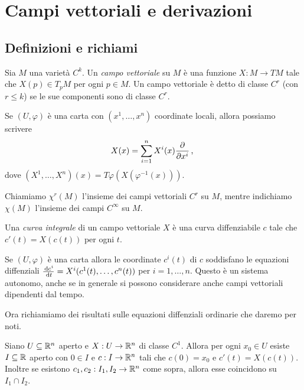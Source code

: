 \chapter{Campi vettoriali e derivazioni}

\section{Definizioni e richiami}

\begin{definition} 
	Sia $M$ una varietà $C^k$. Un \emph{campo vettoriale} su $M$ è una funzione $X:M\to TM$ tale che $X(p)\in T_pM$ per ogni $p\in M$. Un campo vettoriale è detto di classe $C^r$ (con $r\le k$) se le sue componenti sono di classe $C^r$.
\end{definition}

Se $(U,\varphi)$ è una carta con $(x^1,\dots,x^n)$ coordinate locali, allora possiamo scrivere
\begin{equation*}
	X(x)=\sum_{i=1}^nX^i(x)\frac{\partial}{\partial x^i}\, \text{, }
\end{equation*}
dove $(X^1,\dots,X^n)(x)=T\varphi(X(\varphi^{-1}(x)))$.

 
Chiamiamo $\chi^r(M)$ l'insieme dei campi vettoriali $C^r$ su $M$, mentre indichiamo $\chi(M)$ l'insieme dei campi $C^\infty$ su $M$.
 
\begin{definition} 
	Una \emph{curva integrale} di un campo vettoriale $X$ è una curva diffenziabile $c$ tale che $c'(t)=X(c(t))$ per ogni $t$.
\end{definition}

Se $(U,\varphi)$ è una carta allora le coordinate $c^i(t)$ di $c$ soddisfano le equazioni diffenziali $\frac{\,\mathrm d c^i}{\,\mathrm d t}=X^i(c^1(t),\dots,c^n(t))$ per $i=1,\dots,n$. Questo è un sistema autonomo, anche se in generale si possono considerare anche campi vettoriali dipendenti dal tempo.
 
Ora richiamiamo dei risultati sulle equazioni diffenziali ordinarie che daremo per noti.
 
\begin{theorem}  
	Siano $U\subseteq\mathbb R^n$ aperto e $X:U\to\mathbb R^n$ di classe $C^1$. Allora per ogni $x_0\in U$ esiste $I\subseteq\mathbb R$ aperto con $0\in I$ e $c:I\to\mathbb R^n$ tali che $c(0)=x_0$ e $c'(t)=X(c(t))$. Inoltre se esistono $c_1,c_2:I_1,I_2\to\mathbb R^n$ come sopra, allora esse coincidono su $I_1\cap I_2$.
\end{theorem}

